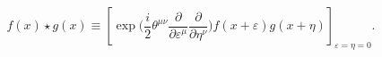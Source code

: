 \begin{equation}
f(x)\star g(x)\equiv \left[ \exp \bigg(\frac{i}{2}\theta^{\mu\nu}{\frac{\partial
}{\partial \varepsilon^\mu}}{\frac{\partial }{\partial \eta^\nu}} \bigg) %
f(x+\varepsilon )g(x+\eta )\right] _{\varepsilon =\eta =0}.  \label{moyal}
\end{equation}


